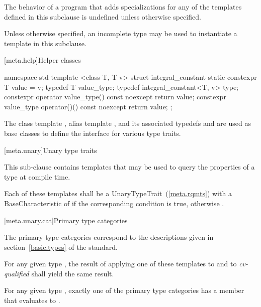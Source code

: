 \pnum
The behavior of a program that adds specializations for any of
the templates defined in this subclause is undefined unless otherwise specified.

\pnum
Unless otherwise specified, an incomplete type may be used
to instantiate a template in this subclause.

[meta.help]{Helper classes}

\begin{codeblock}
namespace std {
  template <class T, T v>
  struct integral_constant {
    static constexpr T value = v;
    typedef T value_type;
    typedef integral_constant<T, v> type;
    constexpr operator value_type() const noexcept { return value; }
    constexpr value_type operator()() const noexcept { return value; }
  };
}
\end{codeblock}

\pnum
The class template ,
alias template , and
its associated typedefs  and 
are used as base classes to define
the interface for various type traits.

[meta.unary]{Unary type traits}

\pnum
This sub-clause contains templates that may be used to query the
properties of a type at compile time.

\pnum
Each of these templates shall be a
UnaryTypeTrait~(\ref{meta.rqmts})
with a BaseCharacteristic of
 if the corresponding condition is true, otherwise
.

[meta.unary.cat]{Primary type categories}

\pnum
The primary type categories correspond to the descriptions given in
section~\ref{basic.types} of the \Cpp standard.

\pnum
For any given type , the result of applying one of these templates to
 and to \textit{cv-qualified}  shall yield the same result.

\pnum
\enternote
For any given type , exactly one of the primary type categories
has a  member that evaluates to .
\exitnote

